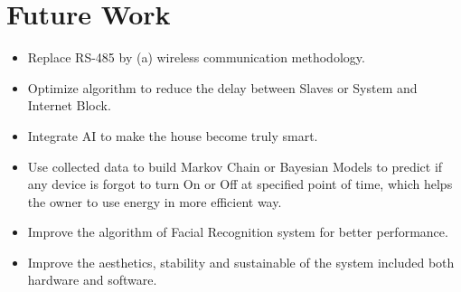\section{Future Work}
\begin{itemize}
\item Replace RS-485 by (a) wireless communication methodology.
\item Optimize algorithm to reduce the delay between Slaves or System and Internet Block.
\item Integrate AI to make the house become truly smart.
\item Use collected data to build Markov Chain or Bayesian Models to predict if any device is forgot to turn On or Off at specified point of time, which helps the owner to use energy in more efficient way.
\item Improve the algorithm of Facial Recognition system for better performance.
\item Improve the aesthetics, stability and sustainable of the system included both hardware and software.
\end{itemize}

